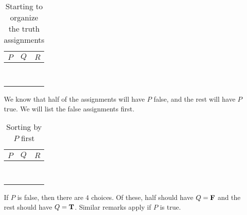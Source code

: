 		\begin{table}[h!]
	\begin{center}
		\caption{Starting to organize the truth assignments}
		\begin{tabular}{c|c|c} 
			$P$ & $Q$ & $R$ \\
			\hline
			&  &  \\  \hline
			&  &  \\  \hline
			&  &  \\  \hline
			&  &  \\  \hline
            &  &  \\  \hline
            &  &  \\  \hline
            &  &  \\  \hline
            &  &  \\  \hline
		\end{tabular}
	\end{center}
\end{table}

We know that half of the assignments will have $P$ false, and the rest will have $P$ true.  We will list the false assignments first.


		\begin{table}[h!]
	\begin{center}
		\caption{Sorting by $P$ first}
		\begin{tabular}{c|c|c} 
			$P$ & $Q$ & $R$ \\
			\hline
			\F &  &  \\  \hline
			\F &  &  \\  \hline
			\F &  &  \\  \hline
			\F &  &  \\  \hline
			\T &  &  \\  \hline
			\T &  &  \\  \hline
			\T &  &  \\  \hline
			\T &  &  \\  \hline
		\end{tabular}
	\end{center}
\end{table}

If $P$ is false, then there are $4$ choices.  Of these, half should have $Q = \textbf{\textrm{F}}$ and the rest should have $Q = \textbf{\textrm{T}}$.  Similar remarks apply if $P$ is true.


